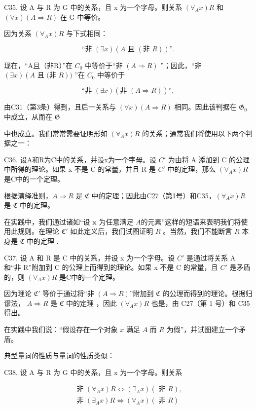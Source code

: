 C35. 设 A 与 R 为 G 中的关系，且 x 为一个字母。则关系 \((\forall_{A}x)R\) 和 \((\forall x)(A\Longrightarrow R)\) 在 G 中等价。

因为关系 \((\forall_{A}x)R\) 与下式相同：

\[
\text{``非 } (\exists x) (A \text{ 且 } (\text{非 } R))\text{''}.
\]

现在，“A且（非R）”在 \(C_{0}\) 中等价于“非 \((A \Longrightarrow R)\) ”；因此，“非 \((\exists x)(A \text{ 且 (非 } R))\) ”在 \(C_{0}\) 中等价于

\[
\text{``非 } (\exists x) (\text{非 } (A \Rightarrow R))\text{''},
\]

由C31（第3条）得到，且后一关系与 \((\forall x)(A \Rightarrow R)\) 相同。因此该判据在 \(\mathfrak{G}_0\) 中成立，从而在 \(\mathfrak{G}\)

中也成立。我们常常需要证明形如 \((\forall_{A}x)R\) 的关系；通常我们将使用以下两个判据之一：

C36. 设A和R为C中的关系，并设x为一个字母。设 \(C'\) 为由将 A 添加到 C 的公理中所得的理论。如果 x 不是 C 的常量，并且 R 是 \(C'\) 中的定理，那么 \((\forall_{A}x)R\) 是C中的一个定理。

根据演绎准则，\(A \Longrightarrow R\) 是 \(\mathfrak{C}\) 中的定理；因此由C27（第1号）和C35，\((\forall_A x) R\) 是 \(\mathfrak{C}\) 中的定理。

在实践中，我们通过诸如“设 \(\pmb{x}\) 为任意满足 \(A\)的元素”这样的短语来表明我们将使用此规则。在理论 \(\mathfrak{C}'\) 如此定义后，我们试图证明 \(R\) 。当然，我们不能断言 \(R\) 本身是 \(\mathfrak{C}\) 中的定理 .

C37. 设 A 和 R 是 C 中的关系，并设 x 为一个字母。设 \(C'\) 是通过将关系 A 和“非 R”附加到 C 的公理上而得到的理论。如果 x 不是 C 的常量，且 \(C'\) 是矛盾的，则 \((\forall_{A}x)R\) 是C中的一个定理。

因为理论 \(\mathfrak{C}'\) 等价于通过将“非 \((A \Longrightarrow R)\)”附加到 \(\mathfrak{C}\) 的公理而得到的理论。根据归谬法， \(A \Longrightarrow R\) 是 \(\mathfrak{C}\) 中的定理 ，因此 \((\forall_A x)R\) 也是，由 C27（第 1 号）和 C35 得出。

在实践中我们说：“假设存在一个对象 \(x\) 满足 \(A\) 而 \(R\) 为假”，并试图建立一个矛盾。

典型量词的性质与量词的性质类似：

C38. 设 A 与 R 为 G 中的关系，且 x 为一个字母。则关系

\[
\begin{array}{l} \text { 非 } (\forall_ {A} x) R \Longleftrightarrow (\exists_ {A} x) (\text { 非 } R), \\ \text { 非 } (\exists_ {A} x) R \Longleftrightarrow (\forall_ {A} x) (\text { 非 } R) \end{array}
\]

